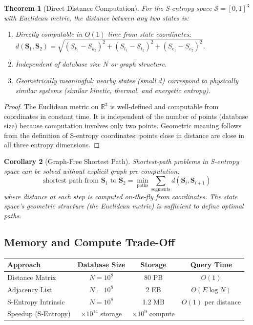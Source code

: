 \documentclass[twocolumn,11pt,a4paper]{article}
\newtheorem{theorem}{Theorem}[section]
\newtheorem{corollary}[theorem]{Corollary}
\newcommand{\Sk}{S_k}
\newcommand{\St}{S_t}
\newcommand{\Se}{S_e}
\newcommand{\Stuple}{\mathbf{S}}
\newcommand{\calS}{\mathcal{S}}
\begin{document}
\begin{theorem}[Direct Distance Computation]
\label{thm:intrinsic_metric}
For the S-entropy space $\calS = [0,1]^3$ with Euclidean metric, the distance between any two states is:
\begin{enumerate}[nosep,label=(\roman*)]
  \item Directly computable in $O(1)$ time from state coordinates: $d(\Stuple_1, \Stuple_2) = \sqrt{(\Sk_1-\Sk_2)^2 + (\St_1-\St_2)^2 + (\Se_1-\Se_2)^2}$.
  \item Independent of database size $N$ or graph structure.
  \item Geometrically meaningful: nearby states (small $d$) correspond to physically similar systems (similar kinetic, thermal, and energetic entropy).
\end{enumerate}
\end{theorem}

\begin{proof}
The Euclidean metric on $\mathbb{R}^3$ is well-defined and computable from coordinates in constant time. It is independent of the number of points (database size) because computation involves only two points. Geometric meaning follows from the definition of S-entropy coordinates: points close in distance are close in all three entropy dimensions.
\end{proof}

\begin{corollary}[Graph-Free Shortest Path]
\label{cor:graph_free}
Shortest-path problems in S-entropy space can be solved without explicit graph pre-computation:
\begin{equation}
\text{shortest path from } \Stuple_1 \text{ to } \Stuple_2 = \min_{\text{paths}} \sum_{\text{segments}} d(\Stuple_i, \Stuple_{i+1})
\end{equation}
where distance at each step is computed on-the-fly from coordinates. The state space's geometric structure (the Euclidean metric) is sufficient to define optimal paths.
\end{corollary}

\subsection{Memory and Compute Trade-Off}

\begin{table}[H]
\centering
\begin{tabular}{lccc}
\toprule
Approach & Database Size & Storage & Query Time \\
\midrule
Distance Matrix & $N=10^8$ & 80 PB & $O(1)$ \\
Adjacency List & $N=10^8$ & 2 EB & $O(E \log N)$ \\
S-Entropy Intrinsic & $N=10^8$ & 1.2 MB & $O(1)$ per distance \\
\midrule
Speedup (S-Entropy) & $\times 10^{14}$ storage & $\times 10^9$ compute \\
\bottomrule
\end{tabular}
\end{table}
\end{document}
